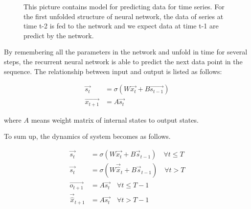 \documentclass[officiallayout]{tktla}
\begin{document}
\begin{figure}[h!]
  \caption{This picture contains model for predicting data for time series. For the first unfolded structure of neural network, the data of series at time t-2 is fed to the network and we expect data at time t-1 are predict by the network.}\label{series_prediction_rnn}
\end{figure}

By remembering all the parameters in the network and unfold in time for several steps, the recurrent neural network is able to predict the next data point in the sequence. The relationship between input and output is listed as follows:

\begin{align}
\vec{s_{t}} &= \sigma(W\vec{x_t} + B\vec{s_{t-1}}) \\
\vec{x_{t+1}} &= A\vec{s_{t}}
\end{align}

where $A$ means weight matrix of internal states to output states.


To sum up, the dynamics of system becomes as follows.

\begin{align}
\vec{s_{t}} &= \sigma(W\vec{x_t} + B\vec{s}_{t-1}) \quad \forall t \leq T \label{training_rnn}\\ 
\vec{s_{t}} &= \sigma(W\vec{\hat{x}}_t + B\vec{s}_{t-1}) \quad \forall t > T \label{prediction_rnn}\\
\vec{o_{t+1}} &= A\vec{s_{t}} \quad \forall t \leq T - 1 \label{train_output}\\
\vec{\hat{x}}_{t+1} &= A\vec{s_{t}}  \quad \forall t > T - 1  \label{train_prediction}
\end{align}
\end{document}
